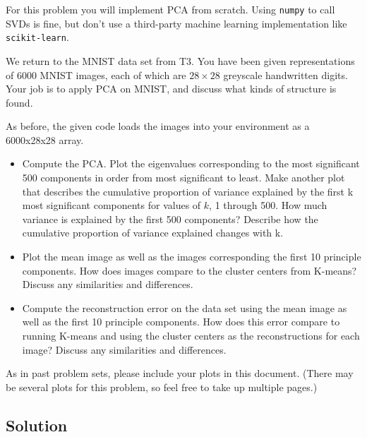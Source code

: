 \documentclass[submit]{harvardml}
\begin{document}
\begin{problem}

For this problem you will implement PCA from scratch.  Using
\texttt{numpy} to call SVDs is fine, but don't use a third-party
machine learning implementation like \texttt{scikit-learn}.

We return to the MNIST data set from T3.  You have been given
representations of 6000 MNIST images, each of which are $28\times28$
greyscale handwritten digits. Your job is to apply PCA on MNIST, and
discuss what kinds of structure is found.  

As before, the given code loads the images into your environment as a
6000x28x28 array.

\begin{itemize}

\item Compute the PCA.  Plot the eigenvalues corresponding to the most significant 500
  components in order from most significant to least. Make another plot that describes the cumulative proportion of variance explained by the first k most significant components for values of $k$, 1 through 500. 
  How much variance is explained by the first 500 components?  Describe
  how the cumulative proportion of variance explained changes with k.  

\item Plot the mean image as well as the images corresponding the
  first 10 principle components.  How does images compare to the
  cluster centers from K-means?  Discuss any similarities and
  differences.

\item Compute the reconstruction error on the data set using the mean
  image as well as the first 10 principle components.  How does this
  error compare to running K-means and using the cluster centers as
  the reconstructions for each image?  Discuss any similarities and
  differences.  

\end{itemize}


As in past problem sets, please include your plots in this
document. (There may be several plots for this problem, so feel free
to take up multiple pages.)


\end{problem}
\subsection*{Solution}
\end{document}
